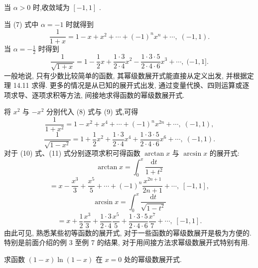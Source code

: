 当 \(\alpha  > 0\) 时,收敛域为 \(\left\lbrack  {-1,1}\right\rbrack\) .

当 (7) 式中 \(\alpha  =  - 1\) 时就得到
\[
\frac{1}{1 + x} = 1 - x + {x}^{2} + \cdots  + {\left( -1\right) }^{n}{x}^{n} + \cdots ,\;\left( {-1,1}\right) . \tag{8}
\]
当 \(\alpha  =  - \frac{1}{2}\) 时得到
\[
\frac{1}{\sqrt{1 + x}} = 1 - \frac{1}{2}x + \frac{1 \cdot  3}{2 \cdot  4}{x}^{2} - \frac{1 \cdot  3 \cdot  5}{2 \cdot  4 \cdot  6}{x}^{3} + \cdots ,\;( - 1,1\rbrack . \tag{9}
\]
一般地说, 只有少数比较简单的函数, 其幂级数展开式能直接从定义出发, 并根据定理 14.11 求得. 更多的情况是从已知的展开式出发, 通过变量代换、四则运算或逐项求导、逐项求积等方法, 间接地求得函数的幂级数展开式.

\begin{example}

\end{example}
将 \({x}^{2}\) 与 \(- {x}^{2}\) 分别代入 (8) 式与 (9) 式,可得
\[
\frac{1}{1 + {x}^{2}} = 1 - {x}^{2} + {x}^{4} + \cdots  + {\left( -1\right) }^{n}{x}^{2n} + \cdots ,\;\left( {-1,1}\right) , \tag{10}
\]
\[
\frac{1}{\sqrt{1 - {x}^{2}}} = 1 + \frac{1}{2}{x}^{2} + \frac{1 \cdot  3}{2 \cdot  4}{x}^{4} + \frac{1 \cdot  3 \cdot  5}{2 \cdot  4 \cdot  6}{x}^{6} + \cdots ,\;\left( {-1,1}\right) . \tag{11}
\]
对于 (10) 式、(11) 式分别逐项求积可得函数 \(\arctan x\) 与 \(\arcsin x\) 的展开式:
\[
\arctan x = {\int }_{0}^{x}\frac{\mathrm{d}t}{1 + {t}^{2}}
\]
\[
= x - \frac{{x}^{3}}{3} + \frac{{x}^{5}}{5} + \cdots  + {\left( -1\right) }^{n}\frac{{x}^{{2n} + 1}}{{2n} + 1} + \cdots ,\;\left\lbrack  {-1,1}\right\rbrack  ,
\]
\[
\arcsin x = {\int }_{0}^{x}\frac{\mathrm{d}t}{\sqrt{1 - {t}^{2}}}
\]
\[
= x + \frac{1}{2}\frac{{x}^{3}}{3} + \frac{1 \cdot  3}{2 \cdot  4}\frac{{x}^{5}}{5} + \frac{1 \cdot  3 \cdot  5}{2 \cdot  4 \cdot  6}\frac{{x}^{7}}{7} + \cdots ,\;\left\lbrack  {-1,1}\right\rbrack  .
\]
由此可见, 熟悉某些初等函数的展开式, 对于一些函数的幂级数展开是极为方便的. 特别是前面介绍的例 3 至例 7 的结果, 对于用间接方法求幂级数展开式特别有用.

\begin{example}

\end{example}
求函数 \(\left( {1 - x}\right) \ln \left( {1 - x}\right)\) 在 \(x = 0\) 处的幂级数展开式.

